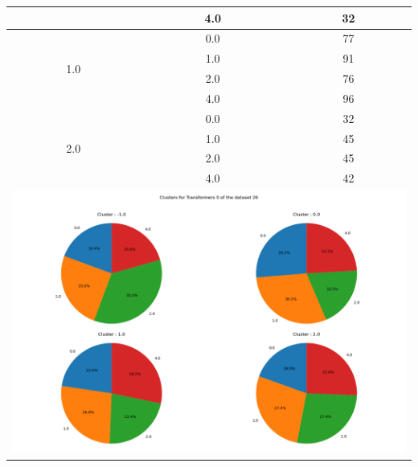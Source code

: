 \begin{longtable}{|c|c|c|c|c|}
& \multicolumn{2}{c|}{4.0} & \multicolumn{2}{c|}{32} \\
\hline
\multirow{4}{*}{1.0} & \multicolumn{2}{c|}{0.0} & \multicolumn{2}{c|}{77} \\
& \multicolumn{2}{c|}{1.0} & \multicolumn{2}{c|}{91} \\
& \multicolumn{2}{c|}{2.0} & \multicolumn{2}{c|}{76} \\
& \multicolumn{2}{c|}{4.0} & \multicolumn{2}{c|}{96} \\
\hline
\multirow{4}{*}{2.0} & \multicolumn{2}{c|}{0.0} & \multicolumn{2}{c|}{32} \\
& \multicolumn{2}{c|}{1.0} & \multicolumn{2}{c|}{45} \\
& \multicolumn{2}{c|}{2.0} & \multicolumn{2}{c|}{45} \\
& \multicolumn{2}{c|}{4.0} & \multicolumn{2}{c|}{42} \\
\hline
\multicolumn{5}{|c|}{\includegraphics[width=0.8\linewidth]{img/annexes/26/clustering_pie_charts/Transformers 0.png}} \\
\end{longtable}


